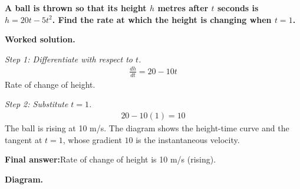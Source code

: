 \documentclass[11pt]{article}
\newcommand{\question}[1]{\par\medskip\noindent\textbf{#1}\par}
\begin{document}
\question{A ball is thrown so that its height \( h \) metres after \( t \) seconds is \( h = 20t - 5t^2 \). Find the rate at which the height is changing when \( t = 1 \).}

\textbf{Worked solution.}

\textit{Step 1: Differentiate with respect to \( t \).}
\[\begin{gathered}
\frac{dh}{dt} = 20 - 10t
\end{gathered}\]
Rate of change of height.

\textit{Step 2: Substitute \( t = 1 \).}
\[\begin{gathered}
20 - 10(1) = 10
\end{gathered}\]
The ball is rising at 10 m/s. The diagram shows the height-time curve and the tangent at \( t = 1 \), whose gradient \( 10 \) is the instantaneous velocity.

\begin{answerbox}
\textbf{Final answer:}\quad Rate of change of height is 10 m/s (rising).
\end{answerbox}
\textbf{Diagram.}
\end{document}
